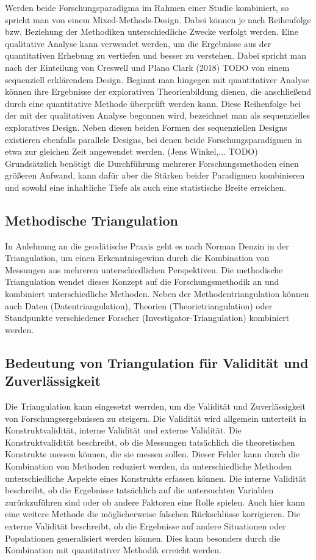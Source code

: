 Werden beide Forschungsparadigma im Rahmen einer Studie kombiniert, so spricht man von einem Mixed-Methods-Design. Dabei können je nach Reihenfolge bzw. Beziehung der Methodiken unterschiedliche Zwecke verfolgt werden. Eine qualitative Analyse kann verwendet werden, um die Ergebnisse aus der quantitativen Erhebung zu vertiefen und besser zu verstehen. Dabei spricht man nach der Einteilung von Creswell und Plano Clark (2018) TODO von einem sequenziell erklärendem Design. Beginnt man hingegen mit quantitativer Analyse können ihre Ergebnisse der explorativen Theorienbildung dienen, die anschließend durch eine quantitative Methode überprüft werden kann. Diese Reihenfolge bei der mit der qualitativen Analyse begonnen wird, bezeichnet man als sequenzielles exploratives Design. Neben diesen beiden Formen des sequenziellen Designs existieren ebenfalls parallele Designs, bei denen beide Forschungsparadigmen in etwa zur gleichen Zeit angewendet werden. (Jens Winkel,... TODO) Grundsätzlich benötigt die Durchführung mehrerer Forschungsmethoden einen größeren Aufwand, kann dafür aber die Stärken beider Paradigmen kombinieren und sowohl eine inhaltliche Tiefe als auch eine statistische Breite erreichen.

\subsection{Methodische Triangulation}

In Anlehnung an die geodätische Praxis geht es nach Norman Denzin in der Triangulation, um einen Erkenntnisgewinn durch die Kombination von Messungen aus mehreren unterschiedlichen Perspektiven. Die methodische Triangulation wendet dieses Konzept auf die Forschungsmethodik an und kombiniert unterschiedliche Methoden. Neben der Methodentriangulation können auch Daten (Datentriangulation), Theorien (Theorietriangulation) oder Standpunkte verschiedener Forscher (Investigator-Triangulation) kombiniert werden.

\subsection{Bedeutung von Triangulation für Validität und Zuverlässigkeit}

Die Triangulation kann eingesetzt werrden, um die Validität und Zuverlässigkeit von Forschungsergebnissen zu steigern. Die Validität wird allgemein unterteilt in Konstruktvalidität, interne Validität und externe Validität. Die Konstruktvalidität beschreibt, ob die Messungen tatsächlich die theoretischen Konstrukte messen können, die sie messen sollen. Dieser Fehler kann durch die Kombination von Methoden reduziert werden, da unterschiedliche Methoden unterschiedliche Aspekte eines Konstrukts erfassen können. Die interne Validität beschreibt, ob die Ergebnisse tatsächlich auf die untersuchten Variablen zurückzuführen sind oder ob andere Faktoren eine Rolle spielen. Auch hier kann eine weitere Methode die möglicherweise falschen Rückschlüsse korrigieren. Die externe Validität beschreibt, ob die Ergebnisse auf andere Situationen oder Populationen generalisiert werden können. Dies kann besonders durch die Kombination mit quantitativer Methodik erreicht werden.

